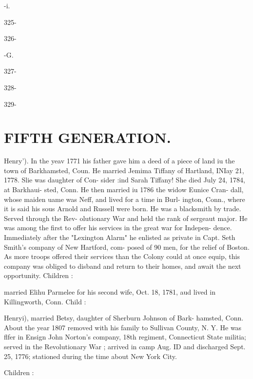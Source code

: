 \documentclass[oneside]{book}
\begin{document}
-i. 


325- 




326- 


-G. 


327- 




328- 




329- 





\section{FIFTH GENERATION.}


Henry'). In the yeav 1771 his father gave him a deed of a piece 
of land iu the town of Barkhamsted, Coun. He married Jemima 
Tiffany of Hartland, INIay 21, 1778. Slie was daughter of Con- 
sider :ind Sarah Tiffany! She died July 24, 1784, at Barkhaui- 
sted, Conn. He then married iu 1786 the widow Eunice Cran- 
dall, whose maiden uame was Neff, and lived for a time in Burl- 
ington, Conn., where it is said his sous Arnold and Russell were 
born. He was a blacksmith by trade. Served through the Rev- 
olutionary War and held the rank of sergeaut major. He was 
among the first to offer his services in the great war for Indepen- 
dence. Immediately after the "Lexington Alarm" he enlisted 
as private in Capt. Seth Smith's company of New Hartford, com- 
posed of 90 men, for the relief of Boston. As more troops 
offered their services than the Colony could at once equip, this 
company was obliged to disband and return to their homes, and 
await the next opportunity. Children : 






married Elihu Parmelee for his second wife, Oct. 18, 1781, aud 
lived in Killingworth, Conn. Child : 


Henryi), married Betsy, daughter of Sherburn Johnson of Bark- 
hamsted, Conn. About the year 1807 removed with his family 
to Sullivan County, N. Y. He was flfer in Ensign John Norton's 
company, 18th regiment, Connecticut State militia; served in the 
Revolutionary War ; arrived in camp Aug. ID and discharged 
Sept. 25, 1776; stationed during the time about New York City. 

Children : 
\end{document}
